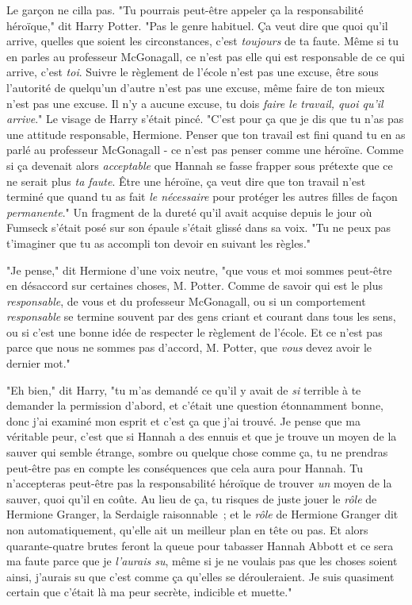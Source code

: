 Le garçon ne cilla pas. "Tu pourrais peut-être appeler ça la responsabilité héroïque," dit Harry Potter. "Pas le genre habituel. Ça veut dire que quoi qu'il arrive, quelles que soient les circonstances, c'est \emph{toujours} de ta faute. Même si tu en parles au professeur McGonagall, ce n'est pas elle qui est responsable de ce qui arrive, c'est \emph{toi}. Suivre le règlement de l'école n'est pas une excuse, être sous l'autorité de quelqu'un d'autre n'est pas une excuse, même faire de ton mieux n'est pas une excuse. Il n'y a aucune excuse, tu dois \emph{faire le travail, quoi qu'il arrive}." Le visage de Harry s'était pincé. "C'est pour ça que je dis que tu n'as pas une attitude responsable, Hermione. Penser que ton travail est fini quand tu en as parlé au professeur McGonagall - ce n'est pas penser comme une héroïne. Comme si ça devenait alors \emph{acceptable} que Hannah se fasse frapper sous prétexte que ce ne serait plus \emph{ta faute}. Être une héroïne, ça veut dire que ton travail n'est terminé que quand tu as fait \emph{le nécessaire} pour protéger les autres filles de façon \emph{permanente}." Un fragment de la dureté qu'il avait acquise depuis le jour où Fumseck s'était posé sur son épaule s'était glissé dans sa voix. "Tu ne peux pas t'imaginer que tu as accompli ton devoir en suivant les règles."

"Je pense," dit Hermione d'une voix neutre, "que vous et moi sommes peut-être en désaccord sur certaines choses, M. Potter. Comme de savoir qui est le plus \emph{responsable}, de vous et du professeur McGonagall, ou si un comportement \emph{responsable} se termine souvent par des gens criant et courant dans tous les sens, ou si c'est une bonne idée de respecter le règlement de l'école. Et ce n'est pas parce que nous ne sommes pas d'accord, M. Potter, que \emph{vous} devez avoir le dernier mot."

"Eh bien," dit Harry, "tu m'as demandé ce qu'il y avait de \emph{si} terrible à te demander la permission d'abord, et c'était une question étonnamment bonne, donc j'ai examiné mon esprit et c'est ça que j'ai trouvé. Je pense que ma véritable peur, c'est que si Hannah a des ennuis et que je trouve un moyen de la sauver qui semble étrange, sombre ou quelque chose comme ça, tu ne prendras peut-être pas en compte les conséquences que cela aura pour Hannah. Tu n'accepteras peut-être pas la responsabilité héroïque de trouver \emph{un} moyen de la sauver, quoi qu'il en coûte. Au lieu de ça, tu risques de juste jouer le \emph{rôle} de Hermione Granger, la Serdaigle raisonnable~; et le \emph{rôle} de Hermione Granger dit non automatiquement, qu'elle ait un meilleur plan en tête ou pas. Et alors quarante-quatre brutes feront la queue pour tabasser Hannah Abbott et ce sera ma faute parce que je \emph{l'aurais su}, même si je ne voulais pas que les choses soient ainsi, j'aurais su que c'est comme ça qu'elles se dérouleraient. Je suis quasiment certain que c'était là ma peur secrète, indicible et muette."

